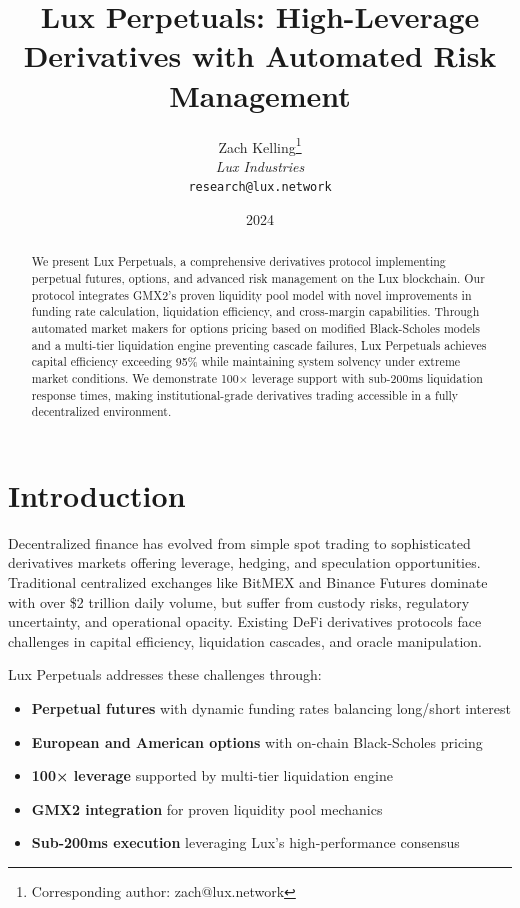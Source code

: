 \documentclass[11pt,a4paper]{article}
\title{\textbf{Lux Perpetuals: High-Leverage Derivatives with Automated Risk Management}}
\author{
Zach Kelling\thanks{Corresponding author: zach@lux.network}\\
\textit{Lux Industries}\\
\texttt{research@lux.network}
}
\date{2024}
\begin{document}
\luxcoverpage
\maketitle

\begin{abstract}
We present Lux Perpetuals, a comprehensive derivatives protocol implementing perpetual futures, options, and advanced risk management on the Lux blockchain. Our protocol integrates GMX2's proven liquidity pool model with novel improvements in funding rate calculation, liquidation efficiency, and cross-margin capabilities. Through automated market makers for options pricing based on modified Black-Scholes models and a multi-tier liquidation engine preventing cascade failures, Lux Perpetuals achieves capital efficiency exceeding 95\% while maintaining system solvency under extreme market conditions. We demonstrate 100× leverage support with sub-200ms liquidation response times, making institutional-grade derivatives trading accessible in a fully decentralized environment.
\end{abstract}

\section{Introduction}

Decentralized finance has evolved from simple spot trading to sophisticated derivatives markets offering leverage, hedging, and speculation opportunities. Traditional centralized exchanges like BitMEX and Binance Futures dominate with over \$2 trillion daily volume, but suffer from custody risks, regulatory uncertainty, and operational opacity. Existing DeFi derivatives protocols face challenges in capital efficiency, liquidation cascades, and oracle manipulation.

Lux Perpetuals addresses these challenges through:
\begin{itemize}
    \item \textbf{Perpetual futures} with dynamic funding rates balancing long/short interest
    \item \textbf{European and American options} with on-chain Black-Scholes pricing
    \item \textbf{100× leverage} supported by multi-tier liquidation engine
    \item \textbf{GMX2 integration} for proven liquidity pool mechanics
    \item \textbf{Sub-200ms execution} leveraging Lux's high-performance consensus
\end{itemize}
\end{document}
